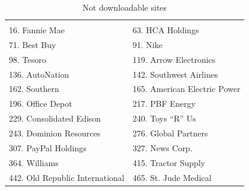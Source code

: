 \documentclass{article}
\begin{document}
\begin{table}[H]
\centering
\caption{Not downloadable sites}
\begin{tabular}{ll}
\hline
 &  \\ 
16. Fannie Mae 
& 63. HCA Holdings \\
71. Best Buy
& 91. Nike \\
98. Tesoro 
& 119. Arrow Electronics\\
136. AutoNation
& 142. Southwest Airlines \\
162. Southern 
& 165. American Electric Power\\
196. Office Depot 
& 217. PBF Energy \\
229. Consolidated Edison
& 240. Toys “R” Us \\
243. Dominion Resources 
& 276. Global Partners\\
307. PayPal Holdings 
& 327. News Corp. \\
364. Williams 
& 415. Tractor Supply\\ 
442. Old Republic International 
& 465. St. Jude Medical \\
\hline

\end{tabular}
\end{table}
\end{document}
